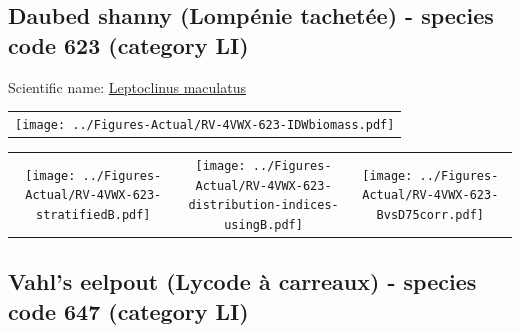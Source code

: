 \documentclass[12pt]{article}\usepackage[]{graphicx}\usepackage[]{color}
\begin{document}
\renewcommand\thefigure{\thesubsection\Alph{figure}}

\setcounter{figure}{0}

\hypertarget{sec:623}{%
\subsection{Daubed shanny (Lompénie tachetée) - species code 623 (category LI)}\label{sec:623}}

  


Scientific name: \href{http://www.marinespecies.org/aphia.php?p=taxdetails\&id=127072}{Leptoclinus maculatus} \newline
\begin{minipage}{1.0\textwidth}
 \begin{tabular}{c}
\texttt{[image: ../Figures-Actual/RV-4VWX-623-IDWbiomass.pdf]} \\ 
\end{tabular} 
\end{minipage}
\newline

\vspace{1cm}
\begin{minipage}{1.0\textwidth}
 \begin{tabular}{ccc}
\texttt{[image: ../Figures-Actual/RV-4VWX-623-stratifiedB.pdf]} & 
\texttt{[image: ../Figures-Actual/RV-4VWX-623-distribution-indices-usingB.pdf]} & 
\texttt{[image: ../Figures-Actual/RV-4VWX-623-BvsD75corr.pdf]} \\ 
\end{tabular} 
\end{minipage}
\clearpage

\renewcommand\thefigure{\thesubsection\Alph{figure}}

\setcounter{figure}{0}

\hypertarget{sec:647}{%
\subsection{Vahl's eelpout (Lycode à carreaux) - species code 647 (category LI)}\label{sec:647}}
\end{document}
